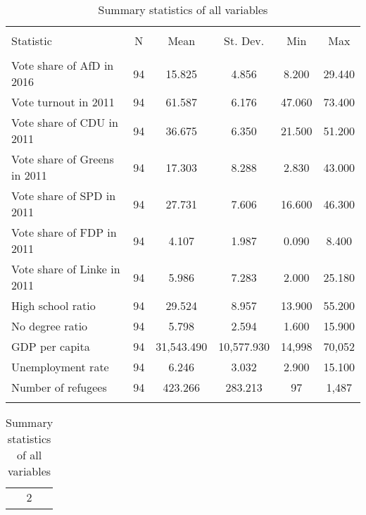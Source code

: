 
\begin{table}[!htbp] \centering 
  \caption{Summary statistics of all variables} 
  \label{} 
\small 
\begin{tabular}{@{\extracolsep{5pt}}lccccc} 
\\[-1.8ex]\hline 
\hline \\[-1.8ex] 
Statistic & \multicolumn{1}{c}{N} & \multicolumn{1}{c}{Mean} & \multicolumn{1}{c}{St. Dev.} & \multicolumn{1}{c}{Min} & \multicolumn{1}{c}{Max} \\ 
\hline \\[-1.8ex] 
Vote share of AfD in 2016 & 94 & 15.825 & 4.856 & 8.200 & 29.440 \\ 
Vote turnout in 2011 & 94 & 61.587 & 6.176 & 47.060 & 73.400 \\ 
Vote share of CDU in 2011 & 94 & 36.675 & 6.350 & 21.500 & 51.200 \\ 
Vote share of Greens in 2011 & 94 & 17.303 & 8.288 & 2.830 & 43.000 \\ 
Vote share of SPD in 2011 & 94 & 27.731 & 7.606 & 16.600 & 46.300 \\ 
Vote share of FDP in 2011 & 94 & 4.107 & 1.987 & 0.090 & 8.400 \\ 
Vote share of Linke in 2011 & 94 & 5.986 & 7.283 & 2.000 & 25.180 \\ 
High school ratio & 94 & 29.524 & 8.957 & 13.900 & 55.200 \\ 
No degree ratio & 94 & 5.798 & 2.594 & 1.600 & 15.900 \\ 
GDP per capita & 94 & 31,543.490 & 10,577.930 & 14,998 & 70,052 \\ 
Unemployment rate & 94 & 6.246 & 3.032 & 2.900 & 15.100 \\ 
Number of refugees & 94 & 423.266 & 283.213 & 97 & 1,487 \\ 
\hline \\[-1.8ex] 
\end{tabular} 
\end{table} 

\begin{table}[!htbp] \centering 
  \caption{Summary statistics of all variables} 
  \label{} 
\small 
\begin{tabular}{@{\extracolsep{5pt}} c} 
\\[-1.8ex]\hline 
\hline \\[-1.8ex] 
$2$ \\ 
\hline \\[-1.8ex] 
\end{tabular} 
\end{table} 
